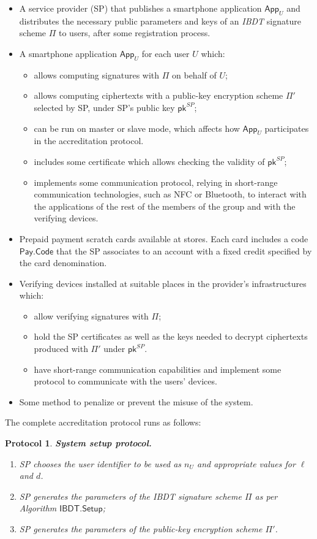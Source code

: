 \documentclass[11pt]{llncs}
\def\pk{\mathsf{pk}}
\newtheorem{proto}{Protocol}
\begin{document}
\begin{itemize}
\item A service provider (SP) that publishes a smartphone
application $\mathsf{App}_U$ and distributes the
necessary public parameters and keys of an
\emph{IBDT} signature scheme $\Pi$ to users,
after some registration process.
\item A smartphone application $\mathsf{App}_U$ for each user $U$ which:
\begin{itemize}
\item allows computing signatures with $\Pi$ on behalf of $U$;
\item allows computing ciphertexts with a
public-key encryption scheme $\Pi'$ selected by
SP, under SP's public key $\pk^{SP}$;
\item can be run on master or slave mode,
which affects how $\mathsf{App}_U$
participates in the accreditation protocol.
\item includes some certificate which allows
checking the validity of $\pk^{SP}$;
\item implements some communication protocol, relying in
short-range communication technologies, such as NFC or
Bluetooth, to interact with the applications of the rest of
the members of the group and with the verifying devices.
\end{itemize}
\item Prepaid payment scratch cards available at stores.
Each card includes a code $\mathsf{Pay.Code}$ that the SP
associates to an account with a fixed credit specified by the card
denomination.
\item Verifying devices installed at suitable places in the provider's
infrastructures which:
\begin{itemize}
\item allow verifying signatures with $\Pi$;
\item hold the SP certificates as well as the keys needed to decrypt
ciphertexts produced with $\Pi'$ under $\pk^{SP}$.
\item have short-range communication capabilities and implement
some protocol to communicate with the users' devices.
\end{itemize}
\item Some method to penalize or prevent the misuse of the system.
\end{itemize}

The complete accreditation protocol runs as follows:

\begin{proto}
\textbf{System setup protocol.}
\begin{enumerate}
\item SP chooses the user identifier
to be used as $n_U$ and appropriate values for $\ell$ and $d$.
\item SP generates the parameters of the \emph{IBDT} signature
scheme $\Pi$ as per Algorithm $\mathsf{IBDT.Setup}$;
\item SP generates the parameters of
the public-key encryption scheme $\Pi'$.
\end{enumerate}
\end{proto}
\end{document}
